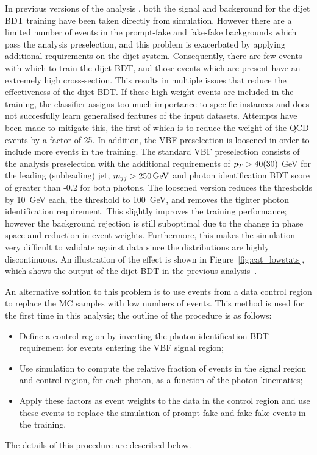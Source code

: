 
In previous versions of the analysis \cite{HIG-16-040}, 
both the signal and background for the dijet BDT training have been taken directly from simulation. 
However there are a limited number of events in the prompt-fake and fake-fake backgrounds
which pass the analysis preselection, 
and this problem is exacerbated by applying additional requirements on the dijet system.
Consequently, there are few events with which to train the dijet BDT, 
and those events which are present have an extremely high cross-section.
This results in multiple issues that reduce the effectiveness of the dijet BDT.
If these high-weight events are included in the training, 
the classifier assigns too much importance to specific instances 
and does not succesfully learn generalised features of the input datasets.
Attempts have been made to mitigate this, 
the first of which is to reduce the weight of the QCD events by a factor of 25.
In addition, the VBF preselection is loosened in 
order to include more events in the training.
The standard VBF preselection consists of the analysis preselection 
with the additional requirements of $p_T > 40 (30)$ GeV for the leading (subleading) jet, 
$m_{jj} > \SI{250}{GeV}$ and photon identification BDT score of greater than -0.2 for both photons.
The loosened version reduces the \pt thresholds by \SI{10}{GeV} each, 
the \mjj threshold to \SI{100}{GeV}, and removes the tighter photon identification requirement.
This slightly improves the training performance; 
however the background rejection is still suboptimal 
due to the change in phase space and reduction in event weights.
Furthermore, this makes the simulation very difficult to validate against data
since the distributions are highly discontinuous.
An illustration of the effect is shown in Figure~\ref{fig:cat_lowstats}, 
which shows the output of the dijet BDT in the previous analysis~\cite{HIG-16-040}.

An alternative solution to this problem is to use events from a data control region 
to replace the MC samples with low numbers of events.
This method is used for the first time in this analysis;
the outline of the procedure is as follows:
\begin{itemize}
\item Define a control region by inverting the photon identification BDT requirement 
      for events entering the VBF signal region;
\item Use simulation to compute the relative fraction of events in the signal region and control region, 
      for each photon, as a function of the photon kinematics;
\item Apply these factors as event weights to the data in the control region 
      and use these events to replace the simulation of prompt-fake and fake-fake events in the training.
\end{itemize}
The details of this procedure are described below.

